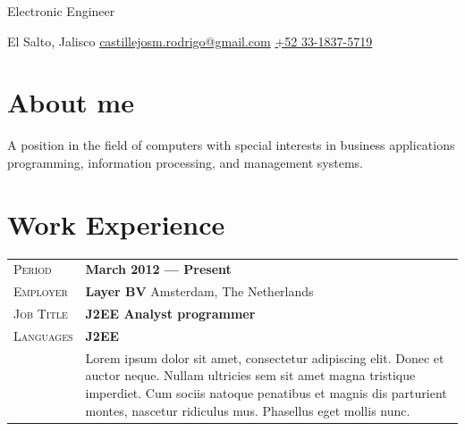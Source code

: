\documentclass[a4paper, oneside, final]{scrartcl} %
\newcommand{\gray}{\rowcolor[gray]{.90}} %
\begin{document}
\begin{center} %


{\fontsize{32}{32}\selectfont\scshape{}} %

\begin{center}
	Electronic Engineer
\end{center}
	\begin{center}      

	{\color{icnclr}\faMapMarker} El Salto, Jalisco \quad 
	{\color{icnclr}\faEnvelope[regular]} \href{mailto:myaname@email.com}{castillejosm.rodrigo@gmail.com} \quad
	{\color{icnclr}} \href{tel:+920000000000}{+52 33-1837-5719} 
\end{center}

\vspace{0.3cm} %


\section{About me}

A position in the field of computers with special interests in business applications \\ programming, information processing, and management systems.


\section{Work Experience}

\begin{tabularx}{0.97\linewidth}{>{\raggedleft\scshape}p{2cm}X}
\gray Period & \textbf{March 2012 --- Present}\\
\gray Employer & \textbf{Layer BV} \hfill Amsterdam, The Netherlands\\
\gray Job Title & \textbf{J2EE Analyst programmer}\\
\gray Languages & \textbf{J2EE}\\
       & Lorem ipsum dolor sit amet, consectetur adipiscing elit. Donec et auctor neque. Nullam ultricies sem sit amet magna tristique imperdiet. Cum sociis natoque penatibus et magnis dis parturient montes, nascetur ridiculus mus. Phasellus eget mollis nunc.
\end{tabularx}


\end{center}
\end{document}

